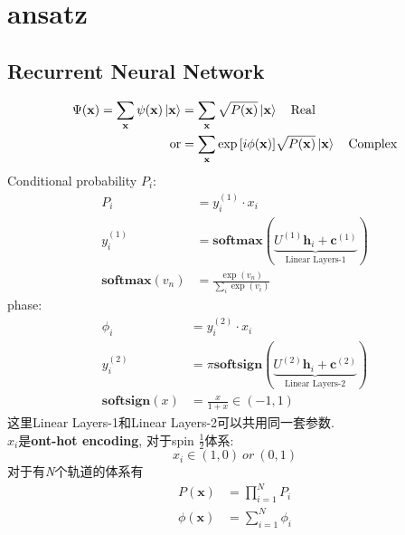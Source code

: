 \section{ansatz}
\subsection{Recurrent Neural Network}
\begin{equation}
    \begin{split}
    \Psi(\mathbf{x}) = \sum_{\mathbf{x}}\psi(\mathbf{x})\ket{\mathbf{x}} &= \sum_{\mathbf{x}}\sqrt{P(\mathbf{x})}\ket{\mathbf{x}} \quad \text{Real} \\
    \text{or} & = \sum_{\mathbf{x}}\exp{[i\phi(\mathbf{x})]}\sqrt{P(\mathbf{x})}\ket{\mathbf{x}} \quad \text{Complex}
    \end{split}
\end{equation}
Conditional probability\cite{HibatAllah2020} $P_i$:
\begin{equation}
    \begin{split}
    P_i& = y_i^{(1)} \cdot x_i \\
    y_i^{(1)} & = \mathbf{softmax}(\underbrace{U^{(1)}\mathbf{h}_i + \mathbf{c}^{(1)}}_{\text{Linear Layers-1}}) \\
    \mathbf{softmax}(v_n) & = \frac{\exp{(v_n)}}{\sum_i \exp{(v_i)}}
    \end{split}
\end{equation}
phase:
\begin{equation}
    \begin{split}
    \phi_i & = y_i^{(2)} \cdot x_i \\
    y_i^{(2)} & = \pi \mathbf{softsign}(\underbrace{U^{(2)}\mathbf{h}_i + \mathbf{c}^{(2)}}_{\text{Linear Layers-2}}) \\
    \mathbf{softsign}(x) & = \frac{x}{1 + x} \in (-1, 1)
    \end{split}
\end{equation}
这里Linear Layers-1和Linear Layers-2可以共用同一套参数.\\
$x_i$是\textbf{ont-hot encoding}, 对于spin $\frac{1}{2}$体系:
\begin{equation}
    x_i \in (1, 0) \ or \ (0, 1)
\end{equation}
对于有\textit{N}个轨道的体系有
\begin{equation}
    \begin{split}
    P(\mathbf{x}) & = \prod_{i=1}^N P_i\\
    \phi(\mathbf{x}) &= \sum_{i=1}^N \phi_i
    \end{split}
\end{equation}

